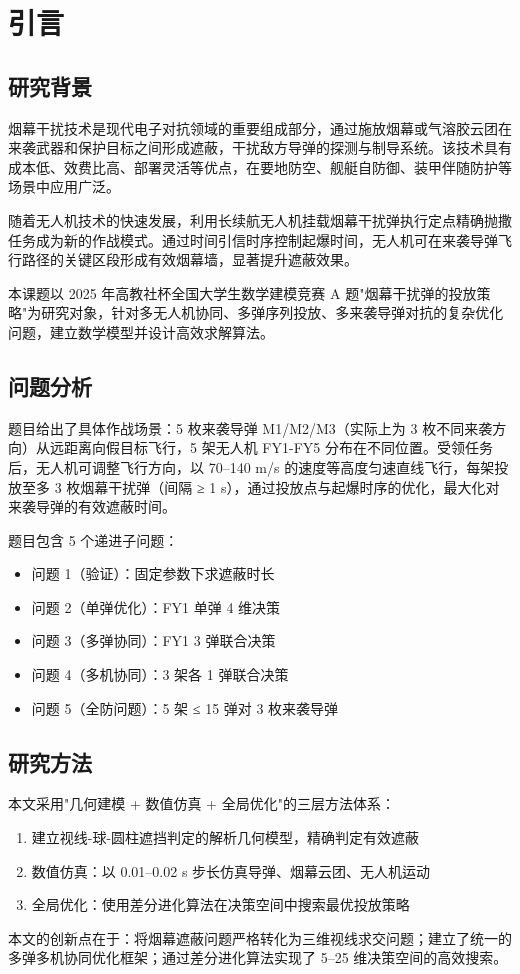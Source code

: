 \section{引言}
\subsection{研究背景}

烟幕干扰技术是现代电子对抗领域的重要组成部分，通过施放烟幕或气溶胶云团在来袭武器和保护目标之间形成遮蔽，干扰敌方导弹的探测与制导系统。该技术具有成本低、效费比高、部署灵活等优点，在要地防空、舰艇自防御、装甲伴随防护等场景中应用广泛。

随着无人机技术的快速发展，利用长续航无人机挂载烟幕干扰弹执行定点精确抛撒任务成为新的作战模式。通过时间引信时序控制起爆时间，无人机可在来袭导弹飞行路径的关键区段形成有效烟幕墙，显著提升遮蔽效果。

本课题以 2025 年高教社杯全国大学生数学建模竞赛 A 题"烟幕干扰弹的投放策略"为研究对象，针对多无人机协同、多弹序列投放、多来袭导弹对抗的复杂优化问题，建立数学模型并设计高效求解算法。

\subsection{问题分析}

题目给出了具体作战场景：5 枚来袭导弹 M1/M2/M3（实际上为 3 枚不同来袭方向）从远距离向假目标飞行，5 架无人机 FY1-FY5 分布在不同位置。受领任务后，无人机可调整飞行方向，以 70--140 m/s 的速度等高度匀速直线飞行，每架投放至多 3 枚烟幕干扰弹（间隔 ≥ 1 s），通过投放点与起爆时序的优化，最大化对来袭导弹的有效遮蔽时间。

题目包含 5 个递进子问题：
\begin{itemize}
  \item 问题 1（验证）：固定参数下求遮蔽时长
  \item 问题 2（单弹优化）：FY1 单弹 4 维决策
  \item 问题 3（多弹协同）：FY1 3 弹联合决策
  \item 问题 4（多机协同）：3 架各 1 弹联合决策
  \item 问题 5（全防问题）：5 架 ≤ 15 弹对 3 枚来袭导弹
\end{itemize}

\subsection{研究方法}

本文采用"几何建模 + 数值仿真 + 全局优化"的三层方法体系：
\begin{enumerate}
  \item 建立视线-球-圆柱遮挡判定的解析几何模型，精确判定有效遮蔽
  \item 数值仿真：以 0.01--0.02 s 步长仿真导弹、烟幕云团、无人机运动
  \item 全局优化：使用差分进化算法在决策空间中搜索最优投放策略
\end{enumerate}

本文的创新点在于：将烟幕遮蔽问题严格转化为三维视线求交问题；建立了统一的多弹多机协同优化框架；通过差分进化算法实现了 5--25 维决策空间的高效搜索。
